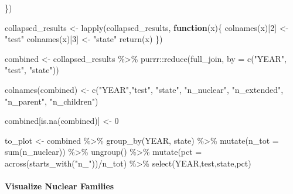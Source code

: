 \documentclass[
]{book}
\newenvironment{Shaded}{\begin{snugshade}}{\end{snugshade}}
\newcommand{\AttributeTok}[1]{\textcolor[rgb]{0.77,0.63,0.00}{#1}}
\newcommand{\ControlFlowTok}[1]{\textcolor[rgb]{0.13,0.29,0.53}{\textbf{#1}}}
\newcommand{\DecValTok}[1]{\textcolor[rgb]{0.00,0.00,0.81}{#1}}
\newcommand{\FunctionTok}[1]{\textcolor[rgb]{0.00,0.00,0.00}{#1}}
\newcommand{\NormalTok}[1]{#1}
\newcommand{\OtherTok}[1]{\textcolor[rgb]{0.56,0.35,0.01}{#1}}
\newcommand{\SpecialCharTok}[1]{\textcolor[rgb]{0.00,0.00,0.00}{#1}}
\newcommand{\StringTok}[1]{\textcolor[rgb]{0.31,0.60,0.02}{#1}}
\begin{document}
\begin{Shaded}
\begin{Highlighting}[]
\NormalTok{\})}


\NormalTok{collapsed\_results }\OtherTok{\textless{}{-}} \FunctionTok{lapply}\NormalTok{(collapsed\_results, }\ControlFlowTok{function}\NormalTok{(x)\{}
  \FunctionTok{colnames}\NormalTok{(x)[}\DecValTok{2}\NormalTok{] }\OtherTok{\textless{}{-}} \StringTok{"test"}
  \FunctionTok{colnames}\NormalTok{(x)[}\DecValTok{3}\NormalTok{] }\OtherTok{\textless{}{-}} \StringTok{"state"}
  \FunctionTok{return}\NormalTok{(x)}
\NormalTok{\})}

\NormalTok{combined }\OtherTok{\textless{}{-}}\NormalTok{ collapsed\_results }\SpecialCharTok{\%\textgreater{}\%}\NormalTok{ purrr}\SpecialCharTok{::}\FunctionTok{reduce}\NormalTok{(full\_join, }\AttributeTok{by =} \FunctionTok{c}\NormalTok{(}\StringTok{"YEAR"}\NormalTok{, }\StringTok{"test"}\NormalTok{, }\StringTok{"state"}\NormalTok{))}



\FunctionTok{colnames}\NormalTok{(combined) }\OtherTok{\textless{}{-}} \FunctionTok{c}\NormalTok{(}\StringTok{"YEAR"}\NormalTok{,}\StringTok{"test"}\NormalTok{, }\StringTok{"state"}\NormalTok{, }\StringTok{"n\_nuclear"}\NormalTok{, }\StringTok{"n\_extended"}\NormalTok{, }\StringTok{"n\_parent"}\NormalTok{, }\StringTok{"n\_children"}\NormalTok{)}

\NormalTok{combined[}\FunctionTok{is.na}\NormalTok{(combined)] }\OtherTok{\textless{}{-}} \DecValTok{0}


\NormalTok{to\_plot }\OtherTok{\textless{}{-}}\NormalTok{ combined }\SpecialCharTok{\%\textgreater{}\%} \FunctionTok{group\_by}\NormalTok{(YEAR, state) }\SpecialCharTok{\%\textgreater{}\%} \FunctionTok{mutate}\NormalTok{(}\AttributeTok{n\_tot =} \FunctionTok{sum}\NormalTok{(n\_nuclear)) }\SpecialCharTok{\%\textgreater{}\%} \FunctionTok{ungroup}\NormalTok{() }\SpecialCharTok{\%\textgreater{}\%} \FunctionTok{mutate}\NormalTok{(}\AttributeTok{pct =}  \FunctionTok{across}\NormalTok{(}\FunctionTok{starts\_with}\NormalTok{(}\StringTok{"n\_"}\NormalTok{))}\SpecialCharTok{/}\NormalTok{n\_tot) }\SpecialCharTok{\%\textgreater{}\%} \FunctionTok{select}\NormalTok{(YEAR,test,state,pct)}
\end{Highlighting}
\end{Shaded}

\hypertarget{visualize-nuclear-families}{%
\paragraph*{Visualize Nuclear Families}\label{visualize-nuclear-families}}
\end{document}

